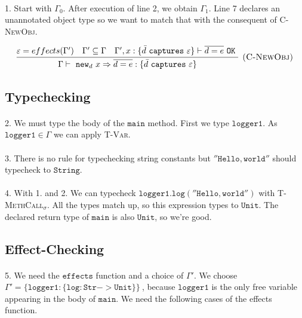 \documentclass{llncs}
\newcommand{\keywadj}[1]{\mathtt{#1}}
\newcommand{\keyw}[1]{\keywadj{#1}~}
\begin{document}
\paragraph{}
1. Start with $\Gamma_0$. After execution of line 2, we obtain $\Gamma_1$. Line 7 declares an unannotated object type so we want to match that with the consequent of \textsc{C-NewObj}.

\[
\begin{array}{c}
\infer[\textsc{(C-NewObj)}]
	{\Gamma \vdash~\keywadj{new}_d~x \Rightarrow \overline{d = e} : \{  \bar d~\keyw{captures} \varepsilon \} }
	{\varepsilon = effects(\Gamma') & \Gamma' \subseteq \Gamma & \Gamma', x : \{ \bar d~\keyw {captures} \varepsilon \} \vdash \overline{d = e}~\keyw{OK}} \\
\end{array}
\]

\subsection*{Typechecking}

\paragraph{}
2. We must type the body of the $\keywadj{main}$ method. First we type $\keywadj{logger1}$. As $\keywadj{logger1 \in \Gamma}$ we can apply  \textsc{T-Var}.

\paragraph{}
3. There is no rule for typechecking string constants but $\keywadj{''Hello, world''}$ should typecheck to $\keywadj{String}$.

\paragraph{}
4. With 1. and 2. We can typecheck $\keywadj{logger1.log(''Hello, world'')}$ with \textsc{T-MethCall$_\sigma$}. All the types match up, so this expression types to $\keywadj{Unit}$. The declared return type of $\keywadj{main}$ is also $\keywadj{Unit}$, so we're good.


\subsection*{Effect-Checking}

\paragraph{}
5. We need the $\keywadj{effects}$ function and a choice of $\Gamma'$. We choose $\keyw{\Gamma' = \{ logger1 : \{ log : Str -> Unit \}\}}$, because $\keywadj{logger1}$ is the only free variable appearing in the body of $\keywadj{main}$. We need the following cases of the effects function.
\end{document}
